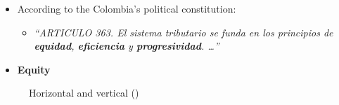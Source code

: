\documentclass[
  ignorenonframetext,
  english,
]{beamer}
\providecommand{\tightlist}{%
  \setlength{\itemsep}{0pt}\setlength{\parskip}{0pt}}\usepackage{longtable,booktabs,array}
\begin{document}
\begin{frame}{}
\label{section-15}
\begin{itemize}
\item
  According to the Colombia's political constitution:

  \begin{itemize}
  \tightlist
  \item
    \emph{``ARTICULO 363. El sistema tributario se funda en los
    principios de \textbf{equidad}, \textbf{eficiencia} y
    \textbf{progresividad}. \ldots{}''}
  \end{itemize}
\item
  \textbf{Equity}
\end{itemize}

\begin{figure}

\begin{minipage}{0.50\linewidth}



\end{minipage}%
%
\begin{minipage}{0.50\linewidth}



\end{minipage}%

\caption{\label{fig-horizontal_vs_vertical_equity}Horizontal and
vertical
()}

\end{figure}%
\end{frame}
\end{document}
